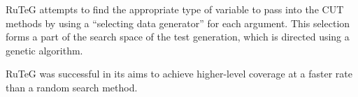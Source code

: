 RuTeG attempts to find the appropriate type of variable to pass into the CUT
methods by using a ``selecting data generator'' for each argument. This selection
forms a part of the search space of the test generation, which is directed using
a genetic algorithm.

RuTeG was successful in its aims to achieve higher-level coverage at a faster
rate than a random search method.
